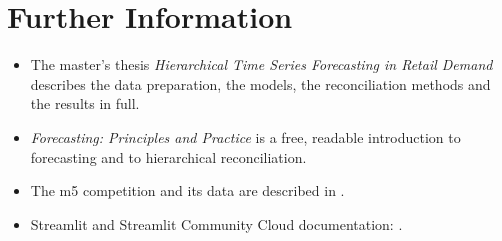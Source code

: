 \section{Further Information}
\label{sec:helpFurther}

\begin{itemize}
  \item The master's thesis \emph{Hierarchical Time Series Forecasting in Retail Demand} describes the data preparation, the models, the reconciliation methods and the results in full.
  \item \emph{Forecasting: Principles and Practice} \cite{Hyndman:2021} is a free, readable introduction to forecasting and to hierarchical reconciliation.
  \item The \ac{m5} competition and its data are described in \cite{Makridakis:2022}.
  \item Streamlit and Streamlit Community Cloud documentation: \cite{Streamlit:2026,StreamlitCloud:2026}.
\end{itemize}
